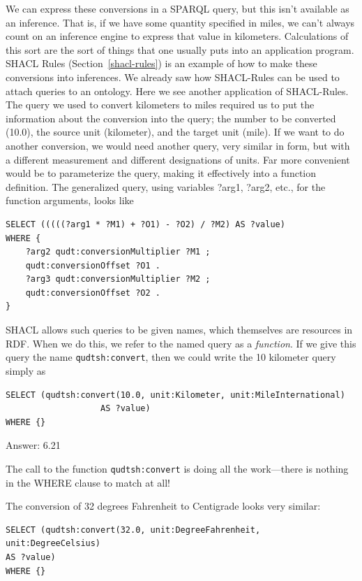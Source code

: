 We can express these conversions in a SPARQL query, but this isn't
available as an inference. That is, if we have some quantity specified
in miles, we can't always count on an inference engine to express that
value in kilometers. Calculations of this sort are the sort of things
that one usually puts into an application program. SHACL Rules
(Section~\ref{shacl-rules}) is an example of
how to make these conversions into inferences.  
We already saw how SHACL-Rules can  be used to
attach queries to an ontology. Here we see another application of SHACL-Rules.
The query we used to convert kilometers to miles required us to put the
information about the conversion into the query; the number to be
converted (10.0), the source unit (kilometer), and the target unit
(mile). If we want to do another conversion, we would need another
query, very similar in form, but with a different measurement and
different designations of units. Far more convenient would be to
parameterize the query, making it effectively into a function
definition. The generalized query, using variables ?arg1, ?arg2, etc.,
for the function arguments, looks like

\begin{lstlisting}
SELECT (((((?arg1 * ?M1) + ?O1) - ?O2) / ?M2) AS ?value)
WHERE {
    ?arg2 qudt:conversionMultiplier ?M1 ;
    qudt:conversionOffset ?O1 .
    ?arg3 qudt:conversionMultiplier ?M2 ;
    qudt:conversionOffset ?O2 .
}
\end{lstlisting}

SHACL allows such queries to be given names, which themselves are
resources in RDF.   When we do this, we refer to the named query 
as a \emph{function}.  If we give this query the 
name \texttt{qudtsh:convert}, then
we could write the 10 kilometer query simply as

\begin{lstlisting}
SELECT (qudtsh:convert(10.0, unit:Kilometer, unit:MileInternational)
                   AS ?value)
WHERE {}
\end{lstlisting}

Answer: 6.21

The call to the function \texttt{qudtsh:convert} is doing all the work---there is
nothing in the
WHERE clause to match at all!

The conversion of 32 degrees Fahrenheit to Centigrade looks very
similar:

\begin{lstlisting}
SELECT (qudtsh:convert(32.0, unit:DegreeFahrenheit,
unit:DegreeCelsius)
AS ?value)
WHERE {}
\end{lstlisting}

